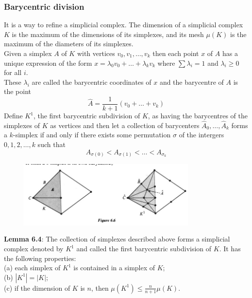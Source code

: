 \documentclass[a4paper]{article}
\begin{document}
\subsubsection*{Barycentric division}
It is a way to refine a simplicial complex. The dimension of a simplicial
complex $K$ is the maximum of the dimensions of its simplexes, and its mesh
$\mu (K)$ is the maximum of the diameters of its simplexes.\\
\linebreak
Given a simplex $A$ of $K$ with vertices $v_0, v_1, \ldots, v_k$ then each
point $x$ of $A$ has a unique expression of the form
$x = \lambda_0 v_0 + \ldots + \lambda_k v_k$ where
$\sum \lambda_i = 1$ and $\lambda_i \ge 0$ for all $i$.\\
These $\lambda_i$ are called the barycentric coordinates of $x$ and the
barycentre of $A$ is the point
\[
\hat{A} = \frac{1}{k+1} \left( v_0 + \ldots + v_k \right) 
\] 
Define $K^{1}$, the first barycentric subdivision of $K$, as having
the barycentres of the simplexes of $K$ as vertices and then
let a collection of barycenters 
$\hat{A}_0, \ldots, \hat{A}_k$ forms a $k$-simplex if and only if
there exists some permutation
$\sigma$ of the intergers $0, 1, 2, \ldots, k$ such that
 \[
A_{\sigma(0)} < A_{\sigma(1)} < \ldots < A_{\sigma_k}
\] 
\begin{figure}[H]
    \centering
    \includegraphics[width=0.8\textwidth]{6.6.png}
    \label{fig:6-6-png}
\end{figure}

\textbf{Lemma 6.4}: The collection of simplexes described above forms
a simplicial complex denoted by $K^{1}$ and called the first barycentric
subdivision of $K$. It has the following properties:\\
(a) each simplex of $K^{1}$ is contained in a simplex of $K$;\\
(b) $\left| K^{1} \right| = \left| K \right| $;\\
(c) if the dimension of $K$ is $n$, then
$\mu (K^{1}) \le \frac{n}{n+1}\mu (K)$.\\
\linebreak
\end{document}
